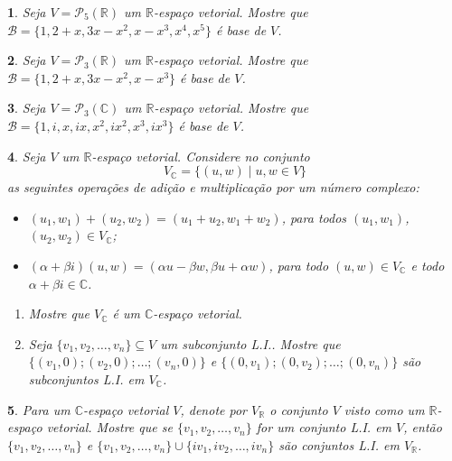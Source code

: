 \documentclass[12pt]{exam}
\newtheorem{exercicio}{}
\newcommand{\sub}{\subseteq}
\newcommand{\real}{\mathbb{R}}
\newcommand{\complex}{\mathbb{C}}
\newcommand{\cp}[1]{\mathbb{#1}}
\begin{document}
\begin{exercicio}
  Seja $V = \mathcal{P}_5(\real)$ um $\real$-espaço vetorial. Mostre que $\mathcal{B} = \{1, 2+x, 3x-x^2,x-x^3, x^4, x^5\}$ \'e base de $V$.
\end{exercicio}

\begin{exercicio}
  Seja $V = \mathcal{P}_3(\real)$ um $\real$-espaço vetorial. Mostre que $\mathcal{B} = \{1, 2+x, 3x-x^2,x-x^3\}$ \'e base de $V$.
\end{exercicio}

\begin{exercicio}
  Seja $V = \mathcal{P}_3(\complex)$ um $\real$-espaço vetorial. Mostre que $\mathcal{B} = \{1, i, x, ix, x^2, ix^2, x^3, ix^3\}$ \'e base de $V$.
\end{exercicio}

\begin{exercicio}
  Seja $V$ um $\real$-espa\c{c}o vetorial. Considere no conjunto
  \[
    V_\cp{C} = \{(u,w) \mid u, w \in V\}
  \]
  as seguintes opera\c{c}\~oes de adi\c{c}\~ao e multiplica\c{c}\~ao por um n\'umero complexo:
  \begin{itemize}
    \item $(u_1, w_1) + (u_2, w_2) = (u_1 + u_2, w_1 + w_2)$, para todos $(u_1, w_1)$, $(u_2, w_2) \in V_\cp{C}$;
    \item $(\alpha + \beta i)(u, w) = (\alpha u - \beta w, \beta u + \alpha w)$, para todo $(u, w) \in V_\cp{C}$ e todo $\alpha + \beta i \in \cp{C}$.
  \end{itemize}
  \begin{enumerate}[label={\alph*})]
    \item Mostre que $V_\cp{C}$ \'e um $\cp{C}$-espa\c{c}o vetorial.
    \item Seja $\{v_1, v_2, \dots, v_n\} \sub V$ um subconjunto L.I.. Mostre que $\{(v_1,0); (v_2,0); \dots; (v_n, 0)\}$ e $\{(0, v_1); (0, v_2); \dots; (0, v_n)\}$ s\~ao subconjuntos L.I. em $V_\cp{C}$.
  \end{enumerate}
\end{exercicio}

\begin{exercicio}
  Para um $\cp{C}$-espa\c{c}o vetorial $V$, denote por $V_\real$ o conjunto $V$ visto como um $\real$-espa\c{c}o  vetorial. Mostre que se $\{v_1, v_2, \dots, v_n\}$ for um conjunto L.I. em $V$, ent\~ao $\{v_1, v_2, \dots, v_n\}$ e $\{v_1, v_2, \dots, v_n\} \cup \{iv_1, iv_2, \dots, iv_n\}$ s\~ao conjuntos L.I. em $V_\real$.
\end{exercicio}
\end{document}
